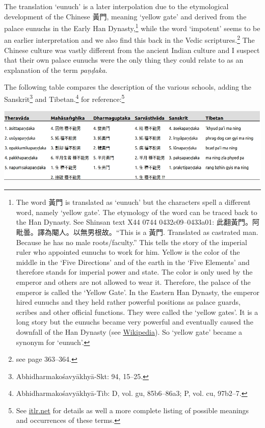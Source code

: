 The translation `eunuch' is a later interpolation due to the etymological development of the Chinese 黃門, meaning `yellow gate' and derived from the palace eunuchs in the Early Han Dynasty,\footnote{The word 黃門 is translated as `eunuch' but the characters spell a different word, namely `yellow gate'. The etymology of the word can be traced back to the Han Dynasty. See Shinsan text X44 0744 0432c09–0433a01: 此翻黃門。阿毗曇。譯為閹人。以無男根故。``This is a 黃門. Translated as castrated man. Because he has no male roots/faculty.'' This tells the story of the imperial ruler who appointed eunuchs to work for him. Yellow is the color of the middle in the `Five Directions' and of the earth in the `Five Elements' and therefore stands for imperial power and state. The color is only used by the emperor and others are not allowed to wear it. Therefore, the palace of the emperor is called the `Yellow Gate'. In the Eastern Han Dynasty, the emperor hired eunuchs and they held rather powerful positions as palace guards, scribes and other official functions. They were called the `yellow gates'. It is a long story but the eunuchs became very powerful and eventually caused the downfall of the Han Dynasty (see \href{https://en.wikipedia.org/wiki/Han_dynasty}{Wikipedia}). So `yellow gate' became a synonym for `eunuch'.} while the word `impotent' seems to be an earlier interpretation and we also find this back in the Vedic scriptures.\footnote{see \cite{zwilling} page 363–364.} The Chinese culture was vastly different from the ancient Indian culture and I suspect that their own palace eunuchs were the only thing they could relate to as an explanation of the term {\em paṇḍaka}.

The following table compares the description of the various schools, adding the Sanskrit\footnote{Abhidharmakośavyākhyā-Skt: 94, 15–25.} and Tibetan.\footnote{Abhidharmakośavyākhyā-Tib: D, vol. gu, 85b6–86a3; P, vol. cu, 97b2–7.} for reference:\footnote{See \href{http://www.itlr.net/hwid:281142}{itlr.net} for details as well a more complete listing of possible meanings and occurrences of these terms.}

\bigskip
\includegraphics[width=\linewidth]{pandaka.jpg}
\label{pandaka}
\medskip

